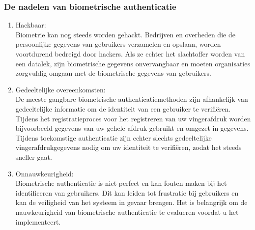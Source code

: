   \subsubsection{De nadelen van biometrische authenticatie}%
  \label{subsubsec:de-nadelen-van-biometrische-authenticatie}
  \begin{enumerate}[label=\textbf{-}]
    \item Hackbaar: \\
    Biometrie kan nog steeds worden gehackt. Bedrijven en overheden die de persoonlijke gegevens van gebruikers verzamelen en opslaan, worden voortdurend bedreigd door hackers. Als ze echter het slachtoffer worden van een datalek, zijn biometrische gegevens onvervangbaar en moeten organisaties zorgvuldig omgaan met de biometrische gegevens van gebruikers.
  
    \item Gedeeltelijke overeenkomsten: \\
    De meeste gangbare biometrische authenticatiemethoden zijn afhankelijk van gedeeltelijke informatie om de identiteit van een gebruiker te verifiëren. Tijdens het registratieproces voor het registreren van uw vingerafdruk worden bijvoorbeeld gegevens van uw gehele afdruk gebruikt en omgezet in gegevens. Tijdens toekomstige authenticatie zijn echter slechts gedeeltelijke vingerafdrukgegevens nodig om uw identiteit te verifiëren, zodat het steeds sneller gaat.
  
    \item Onnauwkeurigheid: \\
    Biometrische authenticatie is niet perfect en kan fouten maken bij het identificeren van gebruikers. Dit kan leiden tot frustratie bij gebruikers en kan de veiligheid van het systeem in gevaar brengen. Het is belangrijk om de nauwkeurigheid van biometrische authenticatie te evalueren voordat u het implementeert.
  \end{enumerate}


